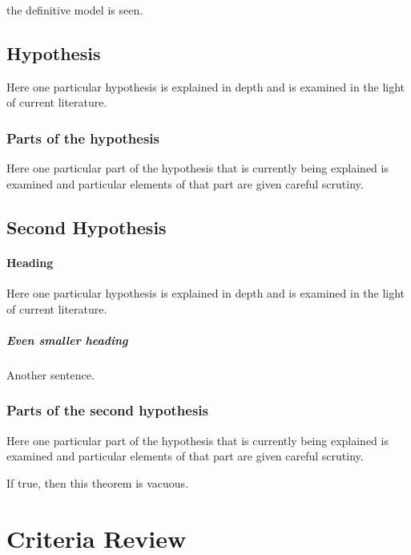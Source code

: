 \autocite{kleeHellyTheoremIts1963} the definitive model is seen.

\subsection{Hypothesis}

Here one particular hypothesis is explained in depth
and is examined in the light of current literature.

\subsubsection{Parts of the hypothesis}

Here one particular part of the hypothesis that is
currently being explained is examined and particular
elements of that part are given careful scrutiny.


\subsection{Second Hypothesis}

\paragraph{Heading} Here one particular hypothesis is explained in depth
and is examined in the light of current literature. \subparagraph{Even smaller heading} Another sentence.

\subsubsection{Parts of the second hypothesis}

Here one particular part of the hypothesis that is
currently being explained is examined and particular
elements of that part are given careful scrutiny.
\begin{theorem}
    If true, then this theorem is vacuous.
\end{theorem}

\section{Criteria Review}

